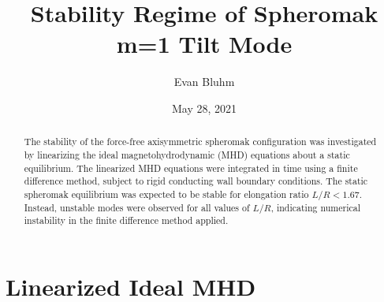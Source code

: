 \documentclass[%
 reprint,
 amsmath,amssymb,
 aps,
]{revtex4-2}
\begin{document}

\title{Stability Regime of Spheromak m=1 Tilt Mode}%

\author{Evan Bluhm}


\date{May 28, 2021}%
\begin{abstract}

The stability of the force-free axisymmetric spheromak configuration was investigated by linearizing the ideal magnetohydrodynamic (MHD) equations about a static equilibrium. The linearized MHD equations were integrated in time using a finite difference method, subject to rigid conducting wall boundary conditions. The static spheromak equilibrium was expected to be stable for elongation ratio $L/R < 1.67$.  Instead, unstable modes were observed for all values of $L/R$, indicating numerical instability in the finite difference method applied.

\end{abstract}

\maketitle


\section{Linearized Ideal MHD}
\end{document}
